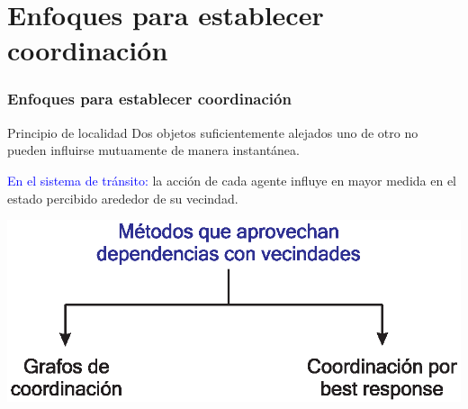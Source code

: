 \documentclass[11pt]{beamer}
\begin{document}
\section{Enfoques para establecer coordinación}
\begin{frame}
\frametitle{Enfoques para establecer coordinación}
\begin{block}{Principio de localidad}
Dos objetos suficientemente alejados uno de otro no pueden influirse mutuamente de manera instantánea.
\end{block}
\bigskip
\textcolor{blue}{En el sistema de tránsito:} la acción de cada agente influye en mayor medida en el estado percibido arededor de su vecindad.\\
\begin{center}
\includegraphics[scale=0.6]{./graficas/solProp.eps}
\end{center}

\end{frame}
\end{document}

